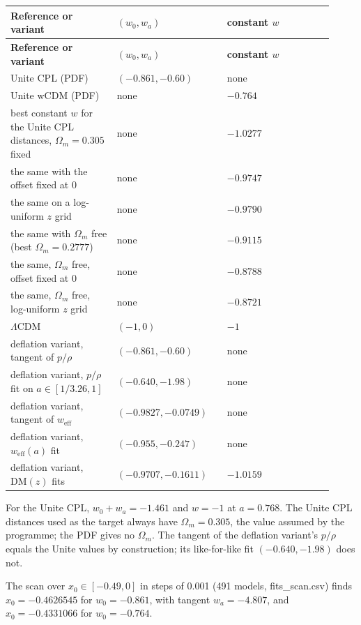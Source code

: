 \documentclass[11pt]{article}
\begin{document}
\begin{longtable}{@{}p{0.307\linewidth}p{0.307\linewidth}p{0.307\linewidth}@{}}
\toprule
\textbf{Reference or variant} & \textbf{$(w_0,w_a)$} & \textbf{constant $w$} \\
\midrule
\endfirsthead
\toprule
\textbf{Reference or variant} & \textbf{$(w_0,w_a)$} & \textbf{constant $w$} \\
\midrule
\endhead
Unite CPL (PDF) & $(-0.861,-0.60)$ & none \\
Unite wCDM (PDF) & none & $-0.764$ \\
best constant $w$ for the Unite CPL distances, $\Omega_m=0.305$ fixed & none & $-1.0277$ \\
the same with the offset fixed at 0 & none & $-0.9747$ \\
the same on a log-uniform $z$ grid & none & $-0.9790$ \\
the same with $\Omega_m$ free (best $\Omega_m=0.2777$) & none & $-0.9115$ \\
the same, $\Omega_m$ free, offset fixed at 0 & none & $-0.8788$ \\
the same, $\Omega_m$ free, log-uniform $z$ grid & none & $-0.8721$ \\
$\Lambda$CDM & $(-1,0)$ & $-1$ \\
deflation variant, tangent of $p/\rho$ & $(-0.861,-0.60)$ & none \\
deflation variant, $p/\rho$ fit on $a\in[1/3.26,1]$ & $(-0.640,-1.98)$ & none \\
deflation variant, tangent of $w_{\mathrm{eff}}$ & $(-0.9827,-0.0749)$ & none \\
deflation variant, $w_{\mathrm{eff}}(a)$ fit & $(-0.955,-0.247)$ & none \\
deflation variant, $\mathrm{DM}(z)$ fits & $(-0.9707,-0.1611)$ & $-1.0159$ \\
\bottomrule
\end{longtable}

For the Unite CPL, $w_0+w_a=-1.461$ and $w=-1$ at $a=0.768$. The Unite CPL distances used as the target always have $\Omega_m=0.305$, the value assumed by the programme; the PDF gives no $\Omega_m$. The tangent of the deflation variant's $p/\rho$ equals the Unite values by construction; its like-for-like fit $(-0.640,-1.98)$ does not.

The scan over $x_0\in[-0.49,0]$ in steps of 0.001 (491 models, fits\_scan.csv) finds $x_0=-0.4626545$ for $w_0=-0.861$, with tangent $w_a=-4.807$, and $x_0=-0.4331066$ for $w_0=-0.764$.
\end{document}
